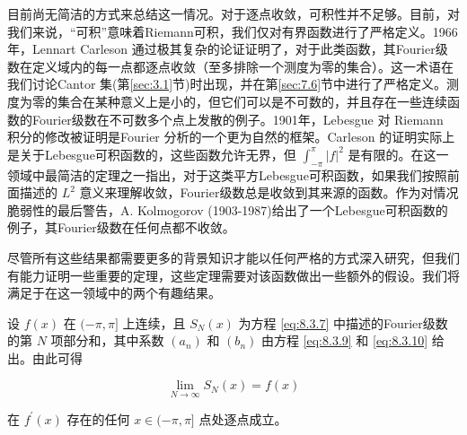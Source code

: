 目前尚无简洁的方式来总结这一情况。对于逐点收敛，可积性并不足够。目前，对我们来说，“可积”意味着Riemann可积，我们仅对有界函数进行了严格定义。1966年，Lennart Carleson 通过极其复杂的论证证明了，对于此类函数，其Fourier级数在定义域内的每一点都逐点收敛（至多排除一个测度为零的集合）。这一术语在我们讨论Cantor 集(第\ref{sec:3.1}节)时出现，并在第\ref{sec:7.6}节中进行了严格定义。测度为零的集合在某种意义上是小的，但它们可以是不可数的，并且存在一些连续函数的Fourier级数在不可数多个点上发散的例子。1901年，Lebesgue 对 Riemann 积分的修改被证明是Fourier 分析的一个更为自然的框架。Carleson 的证明实际上是关于Lebesgue可积函数的，这些函数允许无界，但 \({\int }_{-\pi }^{\pi }{\left| f\right| }^{2}\) 是有限的。在这一领域中最简洁的定理之一指出，对于这类平方Lebesgue可积函数，如果我们按照前面描述的 \({L}^{2}\) 意义来理解收敛，Fourier级数总是收敛到其来源的函数。作为对情况脆弱性的最后警告，A. Kolmogorov (1903-1987)给出了一个Lebesgue可积函数的例子，其Fourier级数在任何点都不收敛。

尽管所有这些结果都需要更多的背景知识才能以任何严格的方式深入研究，但我们有能力证明一些重要的定理，这些定理需要对该函数做出一些额外的假设。我们将满足于在这一领域中的两个有趣结果。

\begin{Thm}
  \label{thm:8.3.3}
  设 \(f\left( x\right)\) 在 \(( - \pi ,\pi \rbrack\) 上连续，且 \({S}_{N}\left( x\right)\) 为方程 \eqref{eq:8.3.7} 中描述的Fourier级数的第 \(N\) 项部分和，其中系数 \(\left( {a}_{n}\right)\) 和 \(\left( {b}_{n}\right)\) 由方程 \eqref{eq:8.3.9} 和 \eqref{eq:8.3.10} 给出。由此可得

\[
\mathop{\lim }\limits_{{N \rightarrow  \infty }}{S}_{N}\left( x\right)  = f\left( x\right)
\]

在 \({f}^{\prime }\left( x\right)\) 存在的任何 \(x \in  ( - \pi ,\pi \rbrack\) 点处逐点成立。
\end{Thm}

